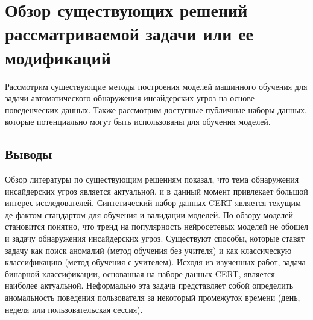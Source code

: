 \chapter{Обзор существующих решений рассматриваемой задачи или ее модификаций}

Рассмотрим существующие методы построения моделей машинного обучения для задачи автоматического обнаружения инсайдерских угроз на основе поведенческих данных. Также рассмотрим доступные публичные наборы данных, которые потенциально могут быть использованы для обучения моделей.



\section{Выводы}

Обзор литературы по существующим решениям показал, что тема обнаружения инсайдерских угроз является актуальной, и в данный момент привлекает большой интерес исследователей. Синтетический набор данных CERT является текущим де-фактом стандартом для обучения и валидации моделей. По обзору моделей становится понятно, что тренд на популярность нейросетевых моделей не обошел и задачу обнаружения инсайдерских угроз. Существуют способы, которые ставят задачу как поиск аномалий (метод обучения без учителя) и как классическую классификацию (метод обучения с учителем). Исходя из изученных работ, задача бинарной классификации, основанная на наборе данных CERT, является наиболее актуальной. Неформально эта задача представляет собой определить аномальность поведения пользователя за некоторый промежуток времени (день, неделя или пользовательская сессия).
